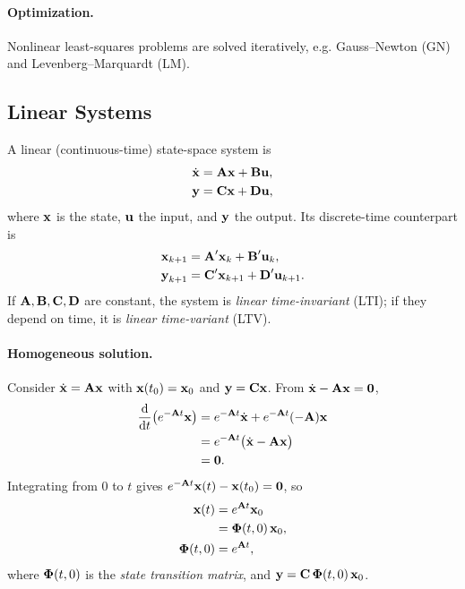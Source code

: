 \paragraph{Optimization.}
Nonlinear least-squares problems are solved iteratively, e.g. Gauss--Newton (GN) and Levenberg--Marquardt (LM).

\subsection{Linear Systems}

A linear (continuous-time) state-space system is
\begin{align}
\dot{\vect{x}} &= \vect{A}\vect{x} + \vect{B}\vect{u}, \\
\vect{y} &= \vect{C}\vect{x} + \vect{D}\vect{u},
\end{align}
where $\vect{x}$ is the state, $\vect{u}$ the input, and $\vect{y}$ the output. Its discrete-time counterpart is
\begin{align}
\vect{x}_{k+1} &= \vect{A}'\vect{x}_k + \vect{B}'\vect{u}_k, \\
\vect{y}_{k+1} &= \vect{C}'\vect{x}_{k+1} + \vect{D}'\vect{u}_{k+1}.
\end{align}
If $\vect{A},\vect{B},\vect{C},\vect{D}$ are constant, the system is \emph{linear time-invariant} (LTI); if they depend on time, it is \emph{linear time-variant} (LTV).

\paragraph{Homogeneous solution.}
Consider $\dot{\vect{x}} = \vect{A}\vect{x}$ with $\vect{x}(t_0)=\vect{x}_0$ and $\vect{y} = \vect{C}\vect{x}$. From $\dot{\vect{x}} - \vect{A}\vect{x} = \vect{0}$,
\begin{align}
\frac{\mathrm{d}}{\mathrm{d}t}\big(e^{-\vect{A}t}\vect{x}\big)
&= e^{-\vect{A}t}\dot{\vect{x}} + e^{-\vect{A}t}(-\vect{A})\vect{x} \\
&= e^{-\vect{A}t}\big(\dot{\vect{x}} - \vect{A}\vect{x}\big) \\
&= \vect{0}.
\end{align}
Integrating from $0$ to $t$ gives $e^{-\vect{A}t}\vect{x}(t) - \vect{x}(t_0) = \vect{0}$, so
\begin{align}
\vect{x}(t) &= e^{\vect{A}t}\vect{x}_0 \\
&= \vect{\Phi}(t,0)\,\vect{x}_0, \\
\vect{\Phi}(t,0) &= e^{\vect{A}t},
\end{align}
where $\vect{\Phi}(t,0)$ is the \emph{state transition matrix}, and $\vect{y} = \vect{C}\,\vect{\Phi}(t,0)\,\vect{x}_0$.

